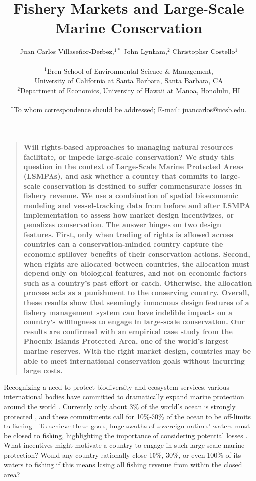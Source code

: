 \documentclass[12pt]{article}
\title{Fishery Markets and Large-Scale Marine Conservation}
\author{Juan Carlos Villase\~{n}or-Derbez,$^{1\ast}$ John Lynham,$^{2}$ Christopher Costello$^{1}$\\
\\
\normalsize{$^{1}$Bren School of Environmental Science \& Management,}\\
\normalsize{University of California at Santa Barbara, Santa Barbara, CA}\\
\normalsize{$^{2}$Department of Economics, University of Hawaii at Manoa, Honolulu, HI}\\
\\
\normalsize{$^\ast$To whom correspondence should be addressed; E-mail: juancarlos@ucsb.edu.}
}
\date{}
\newenvironment{sciabstract}{%
\begin{quote} \bf}
{\end{quote}}
\begin{document}

\baselineskip24pt


\maketitle



\begin{sciabstract}
Will rights-based approaches to managing natural resources facilitate, or impede large-scale conservation? We study this question in the context of Large-Scale Marine Protected Areas (LSMPAs), and ask whether a country that commits to large-scale conservation is destined to suffer commensurate losses in fishery revenue. We use a combination of spatial bioeconomic modeling and vessel-tracking data from before and after LSMPA implementation to assess how market design incentivizes, or penalizes conservation. The answer hinges on two design features. First, only when trading of rights is allowed across countries can a conservation-minded country capture the economic spillover benefits of their conservation actions. Second, when rights are allocated between countries, the allocation must depend only on biological features, and not on economic factors such as a country's past effort or catch. Otherwise, the allocation process acts as a punishment to the conserving country. Overall, these results show that seemingly innocuous design features of a fishery management system can have indelible impacts on a country's willingness to engage in large-scale conservation. Our results are confirmed with an empirical case study from the Phoenix Islands Protected Area, one of the world's largest marine reserves. With the right market design, countries may be able to meet international conservation goals without incurring large costs.
\end{sciabstract}

Recognizing a need to protect biodiversity and ecosystem services, various international bodies have committed to dramatically expand marine protection around the world \cite{dinerstein_2019}. Currently only about 3\% of the world's ocean is strongly protected \cite{sala_2018}, and these commitments call for 10\%-30\% of the ocean to be off-limits to fishing \cite{oleary_2016,dinerstein_2019}. To achieve these goals, huge swaths of sovereign nations' waters must be closed to fishing, highlighting the importance of considering potential losses \cite{smith_2010,mallin_2019}. What incentives might motivate a country to engage in such large-scale marine protection? Would any country rationally close 10\%, 30\%, or even 100\% of its waters to fishing if this means losing all fishing revenue from within the closed area?
\end{document}
